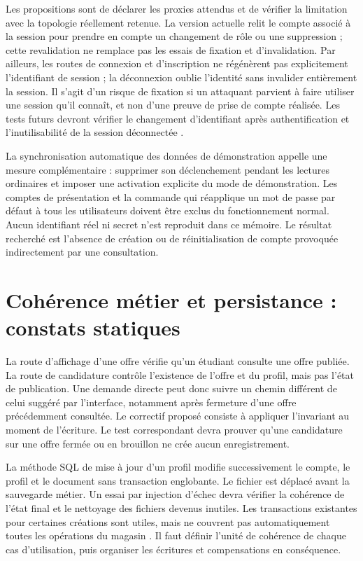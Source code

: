 Les propositions sont de déclarer les proxies attendus et de vérifier la limitation avec la topologie réellement retenue. La version actuelle relit le compte associé à la session pour prendre en compte un changement de rôle ou une suppression ; cette revalidation ne remplace pas les essais de fixation et d'invalidation. Par ailleurs, les routes de connexion et d'inscription ne régénèrent pas explicitement l'identifiant de session ; la déconnexion oublie l'identité sans invalider entièrement la session. Il s'agit d'un risque de fixation si un attaquant parvient à faire utiliser une session qu'il connaît, et non d'une preuve de prise de compte réalisée. Les tests futurs devront vérifier le changement d'identifiant après authentification et l'inutilisabilité de la session déconnectée \cite{owasp-session}.

La synchronisation automatique des données de démonstration appelle une mesure complémentaire : supprimer son déclenchement pendant les lectures ordinaires et imposer une activation explicite du mode de démonstration. Les comptes de présentation et la commande qui réapplique un mot de passe par défaut à tous les utilisateurs doivent être exclus du fonctionnement normal. Aucun identifiant réel ni secret n'est reproduit dans ce mémoire. Le résultat recherché est l'absence de création ou de réinitialisation de compte provoquée indirectement par une consultation.

\section{Cohérence métier et persistance : constats statiques}

La route d'affichage d'une offre vérifie qu'un étudiant consulte une offre publiée. La route de candidature contrôle l'existence de l'offre et du profil, mais pas l'état de publication. Une demande directe peut donc suivre un chemin différent de celui suggéré par l'interface, notamment après fermeture d'une offre précédemment consultée. Le correctif proposé consiste à appliquer l'invariant au moment de l'écriture. Le test correspondant devra prouver qu'une candidature sur une offre fermée ou en brouillon ne crée aucun enregistrement.

La méthode SQL de mise à jour d'un profil modifie successivement le compte, le profil et le document sans transaction englobante. Le fichier est déplacé avant la sauvegarde métier. Un essai par injection d'échec devra vérifier la cohérence de l'état final et le nettoyage des fichiers devenus inutiles. Les transactions existantes pour certaines créations sont utiles, mais ne couvrent pas automatiquement toutes les opérations du magasin \cite{laravel-database}. Il faut définir l'unité de cohérence de chaque cas d'utilisation, puis organiser les écritures et compensations en conséquence.

